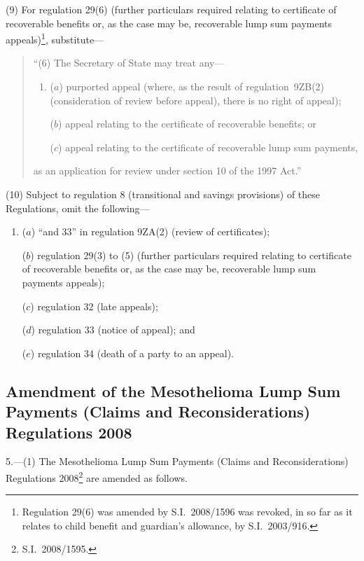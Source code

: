 \documentclass[12pt,a4paper]{article}
\begin{document}
(9) For regulation 29(6) (further particulars required relating to certificate of recoverable benefits or, as the case may be, recoverable lump sum payments appeals)\footnote{Regulation 29(6) was amended by S.I.~2008/1596 was revoked, in so far as it relates to child benefit and guardian’s allowance, by S.I.~2003/916.}, substitute—
\begin{quotation}
“(6) The Secretary of State may treat any—
\begin{enumerate}\item[]
\begin{sloppypar}
($a$) purported appeal (where, as the result of regulation~9ZB(2) (consideration of review before appeal), there is no right of appeal);
\end{sloppypar}

($b$) appeal relating to the certificate of recoverable benefits; or

($c$) appeal relating to the certificate of recoverable lump sum payments,
\end{enumerate}
as an application for review under section 10 of the 1997 Act.”
\end{quotation}

(10) Subject to regulation 8 (transitional and savings provisions) of these Regulations, omit the following—
\begin{enumerate}\item[]
($a$) “and 33” in regulation 9ZA(2) (review of certificates);

($b$) regulation 29(3) to (5) (further particulars required relating to certificate of recoverable benefits or, as the case may be, recoverable lump sum payments appeals);

($c$) regulation 32 (late appeals);

($d$) regulation 33 (notice of appeal); and

($e$) regulation 34 (death of a party to an appeal).
\end{enumerate}

\subsection[5. Amendment of the Mesothelioma Lump Sum Payments (Claims and Reconsiderations) Regulations 2008]{Amendment of the Mesothelioma Lump Sum Payments (Claims and Reconsiderations) Regulations 2008}

5.---(1)  The Mesothelioma Lump Sum Payments (Claims and Reconsiderations) Regulations 2008\footnote{S.I.~2008/1595.} are amended as follows.
\end{document}
